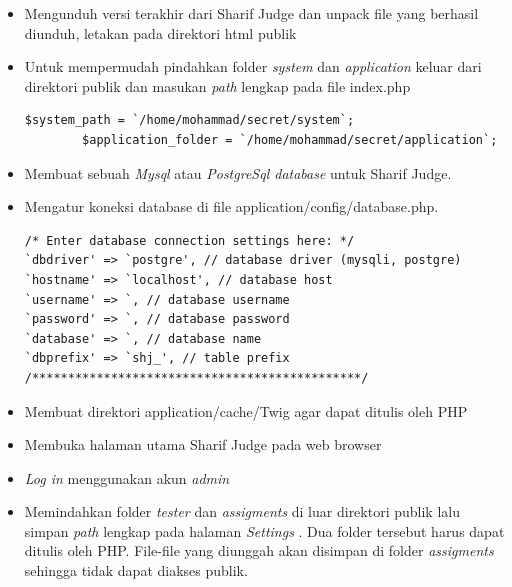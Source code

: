 \begin{itemize}
    \item Mengunduh versi terakhir dari Sharif Judge dan unpack file yang berhasil diunduh, letakan pada direktori html publik
    \item Untuk mempermudah pindahkan folder \textit{system}  dan \textit{application} keluar dari direktori publik dan masukan \textit{path} lengkap pada file index.php

     \begin{lstlisting}[basicstyle=\ttfamily, frame=single,
    columns=fullflexible, breaklines=true, numbers=none]
        $system_path = `/home/mohammad/secret/system`;
        $application_folder = `/home/mohammad/secret/application`;
    \end{lstlisting}

    \item Membuat sebuah \textit{Mysql} atau \textit{PostgreSql database} untuk Sharif Judge.
    \item Mengatur koneksi database di file application/config/database.php.

 \begin{lstlisting}[basicstyle=\ttfamily, frame=single,
    columns=fullflexible, breaklines=true, numbers=none]
/* Enter database connection settings here: */
`dbdriver' => `postgre', // database driver (mysqli, postgre)
`hostname' => `localhost', // database host
`username' => `, // database username
`password' => `, // database password
`database' => `, // database name
`dbprefix' => `shj_', // table prefix
/**********************************************/
    \end{lstlisting}


    \item Membuat direktori application/cache/Twig agar dapat ditulis oleh PHP
    \item Membuka halaman utama Sharif Judge pada web browser \item \textit{Log in}  menggunakan akun \textit{admin}
    \item Memindahkan folder \textit{tester} dan \textit{assigments} di luar direktori publik lalu simpan \textit{path} lengkap pada halaman \textit{Settings} . Dua folder tersebut harus dapat ditulis oleh PHP. File-file yang diunggah akan disimpan di folder \textit{assigments} sehingga tidak dapat diakses publik.
\end{itemize}

